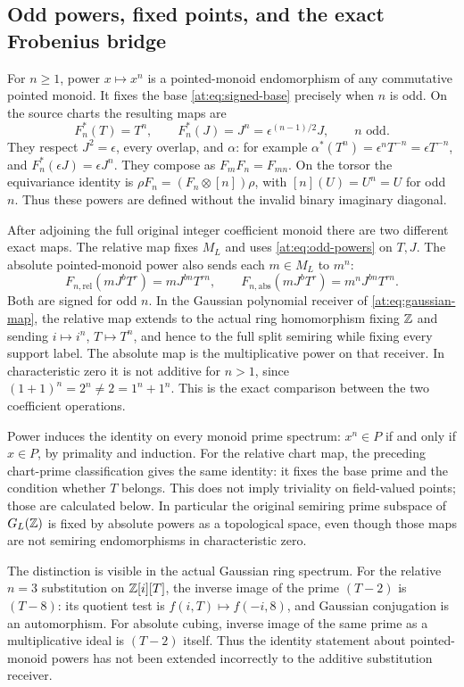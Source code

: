 \subsection{Odd powers, fixed points, and the exact Frobenius bridge}

For $n\ge1$, power $x\mapsto x^n$ is a pointed-monoid
endomorphism of any commutative pointed monoid. It fixes the
base \eqref{at:eq:signed-base} precisely when $n$ is odd. On the
source charts the resulting maps are
\[
 F_n^*(T)=T^n,\qquad F_n^*(J)=J^n=\epsilon^{(n-1)/2}J,
 \qquad n\text{ odd}.
 \tag{AT18}\label{at:eq:odd-powers}
\]
They respect $J^2=\epsilon$, every overlap, and $\alpha$:
for example $\alpha^*(T^n)=\epsilon^nT^{-n}
=\epsilon T^{-n}$, and $F_n^*(\epsilon J)=\epsilon J^n$.
They compose as $F_mF_n=F_{mn}$. On the torsor the equivariance
identity is $\rho F_n=(F_n\otimes[n])\rho$, with
$[n](U)=U^n=U$ for odd $n$. Thus these powers are defined without
the invalid binary imaginary diagonal.

After adjoining the full original integer coefficient monoid there
are two different exact maps. The relative map fixes $M_L$ and
uses \eqref{at:eq:odd-powers} on $T,J$. The absolute pointed-monoid
power also sends each $m\in M_L$ to $m^n$:
\[
 F_{n,\mathrm{rel}}(mJ^bT^r)=mJ^{bn}T^{rn},\qquad
 F_{n,\mathrm{abs}}(mJ^bT^r)=m^nJ^{bn}T^{rn}.
 \tag{AT19}\label{at:eq:two-powers}
\]
Both are signed for odd $n$. In the Gaussian polynomial receiver
of \eqref{at:eq:gaussian-map}, the relative map extends to the actual
ring homomorphism fixing $\mathbb Z$ and sending $i\mapsto i^n$,
$T\mapsto T^n$, and hence to the full split semiring while fixing
every support label. The absolute map is the multiplicative power
on that receiver. In characteristic zero it is not additive for
$n>1$, since $(1+1)^n=2^n\ne2=1^n+1^n$. This is the exact
comparison between the two coefficient operations.

Power induces the identity on every monoid prime spectrum:
$x^n\in P$ if and only if $x\in P$, by primality and induction.
For the relative chart map, the preceding chart-prime classification
gives the same identity: it fixes the base prime and the condition
whether $T$ belongs. This does not imply triviality on field-valued
points; those are calculated below. In particular the original
semiring prime subspace of $G_L(\mathbb Z)$ is fixed by absolute powers
as a topological space, even though those maps are not semiring
endomorphisms in characteristic zero.

The distinction is visible in the actual Gaussian ring spectrum.
For the relative $n=3$ substitution on $\mathbb Z[i][T]$, the inverse
image of the prime $(T-2)$ is $(T-8)$: its quotient test is
$f(i,T)\mapsto f(-i,8)$, and Gaussian conjugation is an
automorphism. For absolute cubing, inverse image of the same
prime as a multiplicative ideal is $(T-2)$ itself. Thus the
identity statement about pointed-monoid powers has not been
extended incorrectly to the additive substitution receiver.

